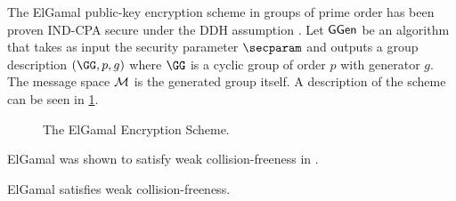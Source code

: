 The ElGamal public-key encryption scheme \cite{C:ElGamal84} in groups of prime order has been proven IND-CPA secure under the DDH assumption \cite{ElGamalSec,C:CraSho98,NaoRei04}.
Let $\mathsf{GGen}$ be an algorithm that takes as input the security parameter $\secparam$ and outputs a group description $(\GG, p, g)$ where $\GG$ is a cyclic group of order $p$ with generator $g$.
The message space $\mathcal{M}$ is the generated group itself.
A description of the scheme can be seen in \cref{fig:regelg}.

\begin{figure}[h]
	\begin{pcvstack}[boxed, center, space=1em]
		\begin{pchstack}[center]
			\procedure[linenumbering]{$\setup(\secparam)$}{
				\pcreturn \groupgen(\secparam)
			}
		\end{pchstack}

		\begin{pchstack}

		\end{pchstack}
	\end{pcvstack}
	\caption{The ElGamal Encryption Scheme.}
	\label{fig:regelg}
\end{figure}

ElGamal was shown to satisfy weak collision-freeness in \cite{AC:Mohassel10}.
\begin{theorem}
	ElGamal satisfies weak collision-freeness.
\end{theorem}
